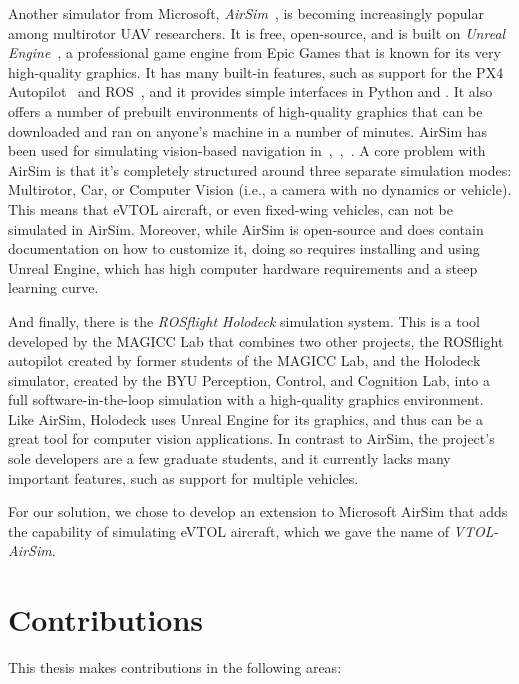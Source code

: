 Another simulator from Microsoft, \textit{AirSim}~\cite{Shah2018}, is becoming increasingly popular among multirotor UAV researchers. It is free, open-source, and is built on \textit{Unreal Engine}~\cite{Games2020}, a professional game engine from Epic Games that is known for its very high-quality graphics. It has many built-in features, such as support for the PX4 Autopilot~\cite{Meier2015} and ROS~\cite{OpenRobotics2013}, and it provides simple interfaces in Python and \CCd. It also offers a number of prebuilt environments of high-quality graphics that can be downloaded and ran on anyone's machine in a number of minutes. AirSim has been used for simulating vision-based navigation in~\cite{Ruf2018},~\cite{Bondi2018},~\cite{Meier2015}. A core problem with AirSim is that it's completely structured around three separate simulation modes: Multirotor, Car, or Computer Vision (i.e., a camera with no dynamics or vehicle). This means that eVTOL aircraft, or even fixed-wing vehicles, can not be simulated in AirSim. Moreover, while AirSim is open-source and does contain documentation on how to customize it, doing so requires installing and using Unreal Engine, which has high computer hardware requirements and a steep learning curve.

And finally, there is the \textit{ROSflight Holodeck} simulation system. This is a tool developed by the MAGICC Lab that combines two other projects, the ROSflight autopilot created by former students of the MAGICC Lab, and the Holodeck simulator, created by the BYU Perception, Control, and Cognition Lab, into a full software-in-the-loop simulation with a high-quality graphics environment. Like AirSim, Holodeck uses Unreal Engine for its graphics, and thus can be a great tool for computer vision applications. In contrast to AirSim, the project's sole developers are a few graduate students, and it currently lacks many important features, such as support for multiple vehicles.

For our solution, we chose to develop an extension to Microsoft AirSim that adds the capability of simulating eVTOL aircraft, which we gave the name of \textit{VTOL-AirSim}.

\section{Contributions}

This thesis makes contributions in the following areas:

